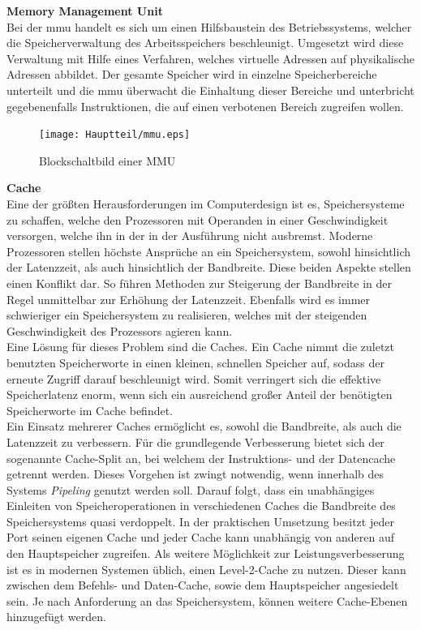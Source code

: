 \textbf{Memory Management Unit}\\
Bei der \ac{mmu} handelt es sich um einen Hilfsbaustein des Betriebssystems, welcher die Speicherverwaltung des Arbeitsspeichers beschleunigt. Umgesetzt wird diese Verwaltung mit
Hilfe eines Verfahren, welches virtuelle Adressen auf physikalische Adressen abbildet.
\newpage
 Der gesamte Speicher wird in einzelne Speicherbereiche unterteilt und die
\ac{mmu} überwacht die Einhaltung dieser Bereiche und unterbricht gegebenenfalls Instruktionen, die auf einen verbotenen
Bereich zugreifen wollen.\cite{itwissen}\\

\begin{figure}[H]
\centering
\texttt{[image: Hauptteil/mmu.eps]}
\caption{Blockschaltbild einer MMU}\label{fig:mmu}
\end{figure}


\textbf{Cache}\\
Eine der größten Herausforderungen im Computerdesign ist es, Speichersysteme zu schaffen, welche den Prozessoren mit Operanden in einer Geschwindigkeit versorgen, welche ihn in der in der
Ausführung nicht ausbremst.
Moderne Prozessoren stellen höchste Ansprüche an ein Speichersystem, sowohl hinsichtlich der Latenzzeit, als auch hinsichtlich der Bandbreite. Diese beiden Aspekte stellen einen Konflikt dar.
So führen Methoden zur Steigerung der Bandbreite in der Regel unmittelbar zur Erhöhung der Latenzzeit.
Ebenfalls wird es immer schwieriger ein Speichersystem zu realisieren, welches mit der steigenden Geschwindigkeit des Prozessors agieren kann.\\
Eine Lösung für dieses Problem sind die Caches. Ein Cache nimmt die zuletzt benutzten Speicherworte in einen kleinen, schnellen Speicher auf, sodass der erneute Zugriff darauf beschleunigt wird.
Somit verringert sich die effektive Speicherlatenz enorm, wenn sich ein ausreichend großer Anteil der benötigten Speicherworte im Cache befindet.\\
Ein Einsatz mehrerer Caches ermöglicht es, sowohl die Bandbreite, als auch die Latenzzeit zu verbessern. Für die grundlegende Verbesserung bietet sich der sogenannte Cache-Split an, bei
welchem der Instruktions- und der Datencache getrennt werden. Dieses Vorgehen ist zwingt notwendig, wenn innerhalb des Systems \emph{Pipeling} genutzt werden soll. Darauf folgt, dass ein unabhängiges Einleiten von Speicheroperationen in verschiedenen Caches die Bandbreite des
Speichersystems quasi verdoppelt. In der praktischen Umsetzung besitzt jeder Port seinen eigenen Cache und jeder Cache kann unabhängig von anderen auf den Hauptspeicher zugreifen.
\newpage
Als weitere Möglichkeit zur Leistungsverbesserung ist es in modernen Systemen üblich, einen Level-2-Cache zu nutzen. Dieser kann zwischen dem Befehls- und Daten-Cache, sowie dem Hauptspeicher
angesiedelt sein. Je nach Anforderung an das Speichersystem, können weitere Cache-Ebenen hinzugefügt werden. \\


